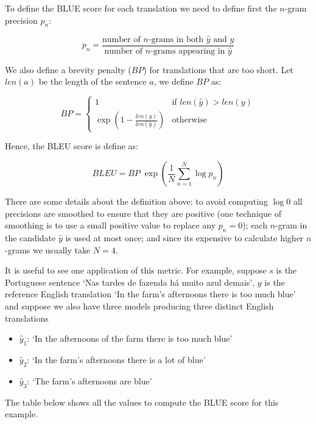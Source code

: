 To define the BLUE score for each translation we need to define first the $n$-gram precision $p_n$:

\begin{equation*}
p_n = \frac{\text{number of } n\text{-grams in both } \hat{y} \text{ and } y}{\text{number of } n\text{-grams appearing in } \hat{y}}
\end{equation*}    

We also define a brevity penalty ($BP$) for translations that are too short. Let $len(a)$ be the length of the sentence $a$, we define $BP$ as:

\begin{equation*}
BP=
\begin{cases}
1 & \text{if } len(\hat{y}) > len(y) \\
\exp\left( 1 - \frac{len(y)}{len(\hat{y})} \right) & \text{otherwise}
\end{cases}
\end{equation*} 


Hence, the BLEU score is define as:

\begin{equation*}
BLEU = BP \; \exp \left(\frac{1}{N}  \sum_{n=1}^{N} \log p_n \right)
\end{equation*}

There are some details about the definition above: to avoid computing $\log 0$ all precisions are smoothed to ensure that they are positive (one technique of smoothing is to use a small positive value to replace any $p_n=0$); each $n$-gram in the candidate $\hat{y}$ is used at most once; and since its expensive to calculate higher $n$-grams we usually take $N=4$.

It is useful to see one application of this metric. For example, suppose $s$ is the Portuguese sentence `Nas tardes de fazenda há muito azul demais', $y$ is the reference English translation `In the farm's afternoons there is too much blue' and suppose we also have three models producing three distinct English translations 

\begin{itemize}
\item $\hat{y}_1$: `In the afternoons of the farm there is too much blue'
\item $\hat{y}_2$: `In the farm's afternoons there is a lot of blue'
\item $\hat{y}_3$: `The farm's afternoons are blue'
\end{itemize}


The table below shows all the values to compute the BLUE score for this example.

